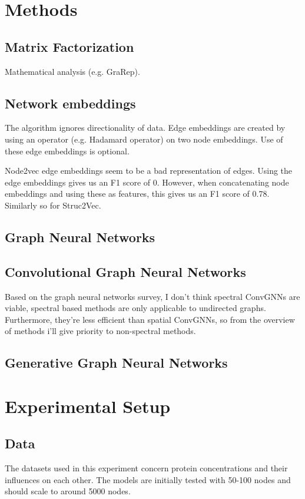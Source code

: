\documentclass{article}
\begin{document}
    \section{Methods}
    \subsection{Matrix Factorization}
    Mathematical analysis (e.g. GraRep).

    \subsection{Network embeddings}

    The algorithm ignores directionality of data. Edge embeddings are created by using an operator (e.g. Hadamard operator) on two node embeddings. Use of these edge embeddings is optional.

    Node2vec edge embeddings seem to be a bad representation of edges. Using the edge embeddings gives us an F1 score of 0. However, when concatenating node embeddings and using these as features, this gives us an F1 score of 0.78. Similarly so for Struc2Vec. 


    \subsection{Graph Neural Networks}
    \subsection{Convolutional Graph Neural Networks}
    Based on the graph neural networks survey, I don't think spectral ConvGNNs are viable, spectral based methods are only applicable to undirected graphs\cite[p.~11]{wu2020comprehensive}. Furthermore, they're less efficient than spatial ConvGNNs, so from the overview of methods i'll give priority to non-spectral methods.

    
    \subsection{Generative Graph Neural Networks}
    
    \section{Experimental Setup}
    \subsection{Data}
    The datasets used in this experiment concern protein concentrations and their influences on each other. The models are initially tested with 50-100 nodes and should scale to around 5000 nodes.
\end{document}
